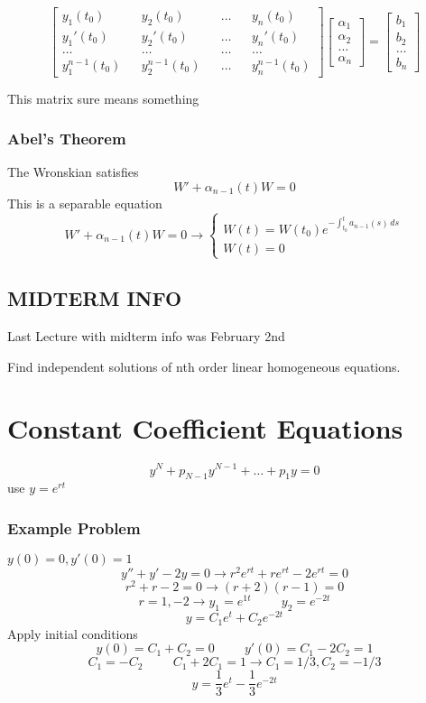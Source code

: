 \documentclass[fleqn]{report}
\newcommand{\hp}{\hspace{1cm}}
\begin{document}
\[
\begin{bmatrix}
y_1(t_0) && y_2(t_0) && \ldots && y_n(t_0) \\
y_1'(t_0) && y_2'(t_0) && \ldots && y_n'(t_0) \\
\ldots && \ldots && \ldots && \ldots \\
y_1^{n-1}(t_0) && y_2^{n-1}(t_0) && \ldots && y_n^{n-1}(t_0) 
\end{bmatrix}
%
\begin{bmatrix}
\alpha_1 \\ \alpha_2 \\ \ldots \\ \alpha_n
\end{bmatrix}
=
\begin{bmatrix}
b_1 \\ b_2 \\ \ldots \\ b_n
\end{bmatrix}
\]

This matrix sure means something

\subsection{Abel's Theorem}
The Wronskian satisfies
\[
W' + \alpha_{n - 1}(t) W = 0
\]
This is a separable equation
\[
W' + \alpha_{n - 1}(t) W = 0
\longrightarrow
\begin{cases}
W(t) = W(t_0)e^{- \int^{t}_{t_0} a_{n-1}(s) \, ds}
\\
W(t) = 0
\end{cases}
\]


\section{MIDTERM INFO}
Last Lecture with midterm info was February 2nd

Find independent solutions of nth order linear homogeneous equations.


\chapter{Constant Coefficient Equations}
\[
y^{N} + p_{N - 1}y^{N-1} + \ldots + p_1y = 0
\]
use $y = e^{rt}$


\subsection{Example Problem}
$y(0) = 0, y'(0) = 1$
\[
y'' + y' - 2y = 0
\rightarrow
r^2e^{rt} + re^{rt} - 2e^{rt} = 0
\]
\[
r^2 + r - 2 = 0 \rightarrow (r + 2)(r - 1) = 0
\]
\[
r = 1, -2
\rightarrow
y_1 = e^{1t}
\hp
y_2 = e^{-2t}
\]
\[
y = C_1e^{t} + C_2e^{-2t}
\]
Apply initial conditions
\[
y(0) = C_1 + C_2 = 0
\hp
y'(0) = C_1 - 2C_2 = 1
\]
\[
C_1 = -C_2
\hp
C_1 + 2C_1 = 1 \rightarrow C_1 = 1/3, C_2 = -1/3
\]
\[
y = \frac{1}{3} e^{t} - \frac{1}{3} e^{-2t}
\]
\end{document}
